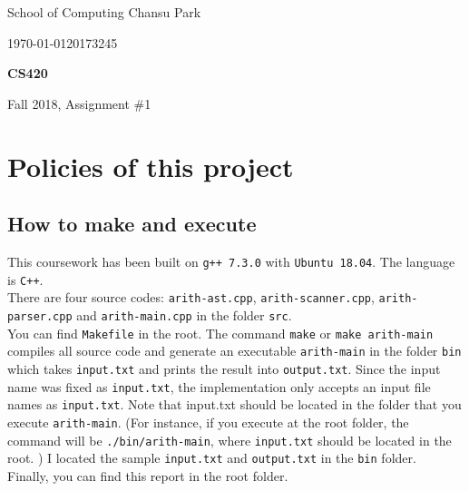 \documentclass[11pt]{article}
\begin{document}
 



{\large
\noindent School of Computing %
\hfill Chansu Park %

\vspace{.1in}

\noindent \today \hfill 20173245}

\vspace{.25in}

\Large{
\begin{center}
\textbf{CS420}

Fall 2018, Assignment \#1
\end{center}
}

\large

\section{Policies of this project} \label{sec:1}
\subsection{How to make and execute} \label{ssec:1.1}
This coursework has been built on \texttt{g++ 7.3.0} with \texttt{Ubuntu 18.04}. The language is \texttt{C++}. \\
There are four source codes: \texttt{arith-ast.cpp}, \texttt{arith-scanner.cpp}, \texttt{arith-parser.cpp} and \texttt{arith-main.cpp} in the folder \texttt{src}. \\
You can find \texttt{Makefile} in the root. The command \texttt{make} or \texttt{make arith-main} compiles all source code and generate an executable \texttt{arith-main} in the folder \texttt{bin} which takes \texttt{input.txt} and prints the result into \texttt{output.txt}. Since the input name was fixed as \texttt{input.txt}, the implementation only accepts an input file names as \texttt{input.txt}. Note that input.txt should be located in the folder that you execute \texttt{arith-main}. (For instance, if you execute at the root folder, the command will be \texttt{./bin/arith-main}, where \texttt{input.txt} should be located in the root. ) I located the sample \texttt{input.txt} and \texttt{output.txt} in the \texttt{bin} folder. \\
Finally, you can find this report in the root folder.
\end{document}
